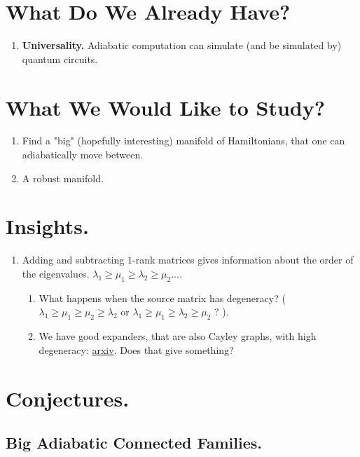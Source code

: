 \documentclass[manuscript,screen,review]{acmart}
\begin{document}
\section{What Do We Already Have?}
\begin{enumerate}
    \item \textbf{Universality.} Adiabatic computation can simulate (and be simulated by) quantum circuits.   
\end{enumerate}
\section{What We Would Like to Study?}
\begin{enumerate}
    \item Find a "big" (hopefully interesting) manifold of Hamiltonians, that one can adiabatically move between. 
    \item A robust manifold.   
\end{enumerate}

\section{Insights.}
\begin{enumerate}
    \item Adding and subtracting $1$-rank matrices gives information about the order of the eigenvalues. $\lambda_{1}\ge \mu_{1} \ge \lambda_{2} \ge \mu_{2} ...$. 
    \begin{enumerate}
        \item What happens when the source matrix has degeneracy?  ( $\lambda_{1} \ge \mu_{1} \ge \mu_{2} \ge \lambda_{2}$ or $\lambda_{1}\ge \mu_{1} \ge \lambda_{2} \ge \mu_{2}$ ? ). 
        \item We have good expanders, that are also Cayley graphs, with high degeneracy: \hyperlink{https://arxiv.org/pdf/2109.13131}{arxiv}. Does that give something? 
    \end{enumerate}
\end{enumerate}

\section{Conjectures.} 

\subsection{Big Adiabatic Connected Families.}
\end{document}

